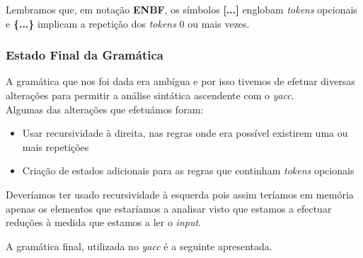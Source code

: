 \documentclass[12pt]{article}
\begin{document}
\vspace{0.5cm}

Lembramos que, em notação \textbf{ENBF}, os símbolos \textbf{[...]} englobam \emph{tokens} opcionais e \textbf{\{...\}} implicam a repetição dos \emph{tokens} 0 ou mais vezes.



\subsubsection{Estado Final da Gramática}
\par A gramática que nos foi dada era ambígua e por isso tivemos de efetuar diversas alterações para permitir a análise sintática ascendente com o \emph{yacc}.\\
Algumas das alterações que efetuámos foram:
\begin{itemize}
	\item Usar recursividade à direita, nas regras onde era possível existirem uma ou mais repetições
	\item Criação de estados adicionais para as regras que continham \emph{tokens} opcionais
\end{itemize}

Deveríamos ter usado recursividade  à esquerda pois assim teríamos em memória apenas os elementos que estaríamos a analisar visto que estamos a efectuar reduções à medida que estamos a ler o \emph{input}.


A gramática final, utilizada no \emph{yacc} é a seguinte apresentada.
\end{document}
